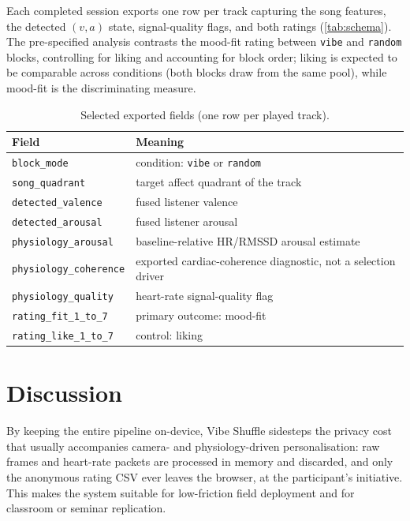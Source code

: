 Each completed session exports one row per track capturing the song features, the
detected $(v, a)$ state, signal-quality flags, and both ratings
(\autoref{tab:schema}). The pre-specified analysis contrasts the mood-fit rating
between \texttt{vibe} and \texttt{random} blocks, controlling for liking and
accounting for block order; liking is expected to be comparable across conditions
(both blocks draw from the same pool), while mood-fit is the discriminating
measure.

\begin{table}[t]
\caption{Selected exported fields (one row per played track).}
\label{tab:schema}
\begin{tabularx}{\linewidth}{@{}lX@{}}
\toprule
Field & Meaning \\
\midrule
\texttt{block\_mode} & condition: \texttt{vibe} or \texttt{random} \\
\texttt{song\_quadrant} & target affect quadrant of the track \\
\texttt{detected\_valence} & fused listener valence \\
\texttt{detected\_arousal} & fused listener arousal \\
\texttt{physiology\_arousal} & baseline-relative HR/RMSSD arousal estimate \\
\texttt{physiology\_coherence} & exported cardiac-coherence diagnostic, not a selection driver \\
\texttt{physiology\_quality} & heart-rate signal-quality flag \\
\texttt{rating\_fit\_1\_to\_7} & primary outcome: mood-fit \\
\texttt{rating\_like\_1\_to\_7} & control: liking \\
\bottomrule
\end{tabularx}
\end{table}

\section{Discussion}

By keeping the entire pipeline on-device, Vibe Shuffle sidesteps the privacy cost
that usually accompanies camera- and physiology-driven personalisation: raw frames
and heart-rate packets are processed in memory and discarded, and only the
anonymous rating CSV ever leaves the browser, at the participant's initiative.
This makes the system suitable for low-friction field deployment and for
classroom or seminar replication.


